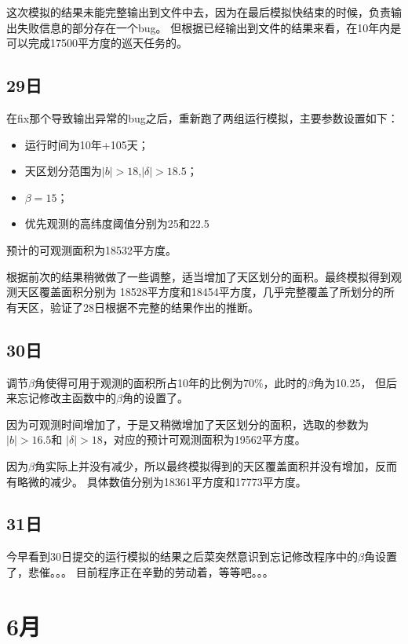 这次模拟的结果未能完整输出到文件中去，因为在最后模拟快结束的时候，负责输出失败信息的部分存在一个bug。
但根据已经输出到文件的结果来看，在10年内是可以完成17500平方度的巡天任务的。

\subsection{29日}
在fix那个导致输出异常的bug之后，重新跑了两组运行模拟，主要参数设置如下：
\begin{itemize}
\item 运行时间为10年+105天；
\item 天区划分范围为$|b|>18$\textdegree ,$|\delta|>18.5$\textdegree ；
\item $\beta=15$\textdegree ；
\item 优先观测的高纬度阈值分别为25\textdegree 和22.5\textdegree
\end{itemize}
预计的可观测面积为18532平方度。

根据前次的结果稍微做了一些调整，适当增加了天区划分的面积。最终模拟得到观测天区覆盖面积分别为
18528平方度和18454平方度，几乎完整覆盖了所划分的所有天区，验证了28日根据不完整的结果作出的推断。


\subsection{30日}
调节$\beta$角使得可用于观测的面积所占10年的比例为$70\%$，此时的$\beta$角为10.25\textdegree，
但后来忘记修改主函数中的$\beta$角的设置了。

因为可观测时间增加了，于是又稍微增加了天区划分的面积，选取的参数为$|b|>16.5$\textdegree 和
$|\delta|>18$\textdegree，对应的预计可观测面积为19562平方度。

因为$\beta$角实际上并没有减少，所以最终模拟得到的天区覆盖面积并没有增加，反而有略微的减少。
具体数值分别为18361平方度和17773平方度。

\subsection{31日}
今早看到30日提交的运行模拟的结果之后菜突然意识到忘记修改程序中的$\beta$角设置了，悲催。。。
目前程序正在辛勤的劳动着，等等吧。。。

\section{6月}

